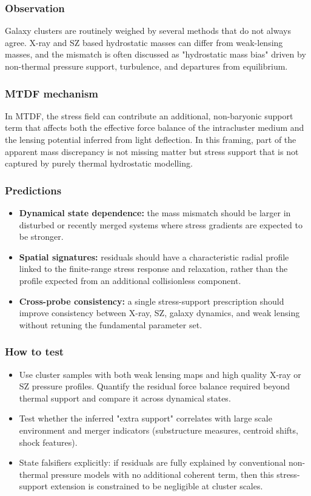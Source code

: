 \documentclass[11pt,a4paper]{article}
\begin{document}
\subsubsection{Observation}
Galaxy clusters are routinely weighed by several methods that do not always agree. X-ray and SZ based hydrostatic masses can differ from weak-lensing masses,
and the mismatch is often discussed as "hydrostatic mass bias" driven by non-thermal pressure support, turbulence, and departures from equilibrium.

\subsubsection{MTDF mechanism}
In MTDF, the stress field can contribute an additional, non-baryonic support term that affects both the effective force balance of the intracluster medium and
the lensing potential inferred from light deflection. In this framing, part of the apparent mass discrepancy is not missing matter but stress support that is not
captured by purely thermal hydrostatic modelling.

\subsubsection{Predictions}
\begin{itemize}
  \item \textbf{Dynamical state dependence:} the mass mismatch should be larger in disturbed or recently merged systems where stress gradients are expected to be stronger.
  \item \textbf{Spatial signatures:} residuals should have a characteristic radial profile linked to the finite-range stress response and relaxation, rather than the profile expected from an additional collisionless component.
  \item \textbf{Cross-probe consistency:} a single stress-support prescription should improve consistency between X-ray, SZ, galaxy dynamics, and weak lensing without retuning the fundamental parameter set.
\end{itemize}

\subsubsection{How to test}
\begin{itemize}
  \item Use cluster samples with both weak lensing maps and high quality X-ray or SZ pressure profiles. Quantify the residual force balance required beyond thermal support and compare it across dynamical states.
  \item Test whether the inferred "extra support" correlates with large scale environment and merger indicators (substructure measures, centroid shifts, shock features).
  \item State falsifiers explicitly: if residuals are fully explained by conventional non-thermal pressure models with no additional coherent term, then this stress-support extension is constrained to be negligible at cluster scales.
\end{itemize}
\end{document}
